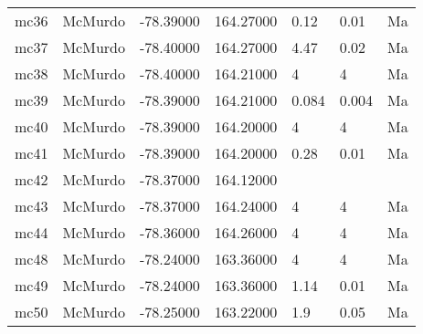 \documentclass{article}
\begin{document}
\begin{longtable}{llrrlll}
  mc36 &  McMurdo & -78.39000 &  164.27000 &    0.12 &      0.01 &    Ma \\
  mc37 &  McMurdo & -78.40000 &  164.27000 &    4.47 &      0.02 &    Ma \\
  mc38 &  McMurdo & -78.40000 &  164.21000 &       4 &         4 &    Ma \\
  mc39 &  McMurdo & -78.39000 &  164.21000 &   0.084 &     0.004 &    Ma \\
  mc40 &  McMurdo & -78.39000 &  164.20000 &       4 &         4 &    Ma \\
  mc41 &  McMurdo & -78.39000 &  164.20000 &    0.28 &      0.01 &    Ma \\
  mc42 &  McMurdo & -78.37000 &  164.12000 &         &           &       \\
  mc43 &  McMurdo & -78.37000 &  164.24000 &       4 &         4 &    Ma \\
  mc44 &  McMurdo & -78.36000 &  164.26000 &       4 &         4 &    Ma \\
  mc48 &  McMurdo & -78.24000 &  163.36000 &       4 &         4 &    Ma \\
  mc49 &  McMurdo & -78.24000 &  163.36000 &    1.14 &      0.01 &    Ma \\
  mc50 &  McMurdo & -78.25000 &  163.22000 &     1.9 &      0.05 &    Ma \\
\end{longtable}
\end{document}
